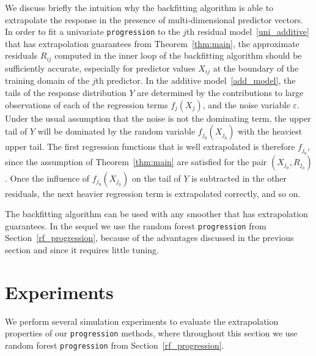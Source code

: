\documentclass{statsoc}
\theoremstyle{break}
\newcommand{\eps}{\varepsilon}
\begin{document}
We discuss briefly the intuition why the backfitting algorithm is able to extrapolate the response in the presence of multi-dimensional predictor vectors.
In order to fit a univariate \texttt{progression} to the $j$th residual model~\eqref{uni_additive} that has extrapolation guarantees from Theorem~\ref{thm:main}, the approximate residuals $R_{ij}$ computed in the inner loop of the backfitting algorithm should be sufficiently accurate, especially for predictor values $X_{ij}$ at the boundary of the training domain of the $j$th predictor. 
In the additive model~\eqref{add_model}, the tails of the response distribution $Y$ are determined by the contributions to large observations of each of the regression terms $f_j(X_j)$, and the noise variable $\eps$. Under the usual assumption that the noise is not the dominating term, the upper tail of $Y$ will be dominated by the random variable $f_{j_0}(X_{j_0})$ with the heaviest upper tail. 
The first regression functions that is well extrapolated is therefore $f_{j_0}$, since the assumption of Theorem~\ref{thm:main} are satisfied for the pair $(X_{j_0}, R_{j_0})$. Once the influence of $f_{j_0}(X_{j_0})$ on the tail of $Y$ is subtracted in the other residuals, the next heavier regression term is extrapolated correctly, and so on.

The backfitting algorithm can be used with any smoother that has extrapolation guarantees. In the sequel we use the random forest \texttt{progression} from Section~\ref{rf_progression}, because of the advantages discussed in the previous section and since it requires little tuning.



\section{Experiments}\label{sec:experiments}

We perform several simulation experiments to evaluate the extrapolation properties of our \texttt{progression} methods, where throughout this section we use random forest \texttt{progression} from Section~\ref{rf_progression}.
\end{document}
